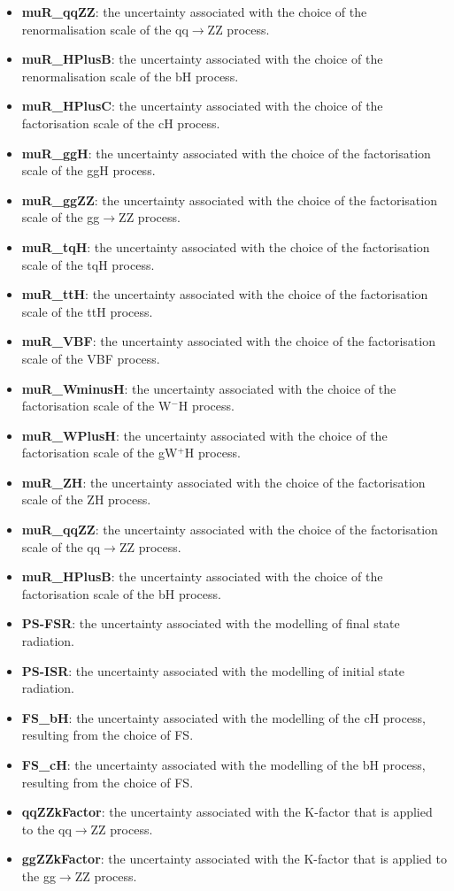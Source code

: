 \begin{itemize}
    \item \textbf{muR\_qqZZ}: the uncertainty associated with the choice of the renormalisation scale of the qq$\rightarrow$ZZ process.
    \item \textbf{muR\_HPlusB}: the uncertainty associated with the choice of the renormalisation scale of the bH process.
    \item \textbf{muR\_HPlusC}: the uncertainty associated with the choice of the factorisation scale of the cH process.
    \item \textbf{muR\_ggH}: the uncertainty associated with the choice of the factorisation scale of the ggH process.
    \item \textbf{muR\_ggZZ}: the uncertainty associated with the choice of the factorisation scale of the gg$\rightarrow$ZZ process.
    \item \textbf{muR\_tqH}: the uncertainty associated with the choice of the factorisation scale of the tqH process.
    \item \textbf{muR\_ttH}: the uncertainty associated with the choice of the factorisation scale of the ttH process.
    \item \textbf{muR\_VBF}: the uncertainty associated with the choice of the factorisation scale of the VBF process.
    \item \textbf{muR\_WminusH}: the uncertainty associated with the choice of the factorisation scale of the W$^{-}$H process.
    \item \textbf{muR\_WPlusH}: the uncertainty associated with the choice of the factorisation scale of the gW$^{+}$H process.
    \item \textbf{muR\_ZH}: the uncertainty associated with the choice of the factorisation scale of the ZH process.
    \item \textbf{muR\_qqZZ}: the uncertainty associated with the choice of the factorisation scale of the qq$\rightarrow$ZZ process.
    \item \textbf{muR\_HPlusB}: the uncertainty associated with the choice of the factorisation scale of the bH process.
    \item \textbf{PS-FSR}: the uncertainty associated with the modelling of final state radiation. 
    \item \textbf{PS-ISR}: the uncertainty associated with the modelling of initial state radiation. 
    \item \textbf{FS\_bH}: the uncertainty associated with the modelling of the cH process, resulting from the choice of FS. 
    \item \textbf{FS\_cH}: the uncertainty associated with the modelling of the bH process, resulting from the choice of FS. 
    \item \textbf{qqZZkFactor}: the uncertainty associated with the K-factor that is applied to the qq$\rightarrow$ZZ process.
    \item \textbf{ggZZkFactor}: the uncertainty associated with the K-factor that is applied to the gg$\rightarrow$ZZ process.
\end{itemize}
